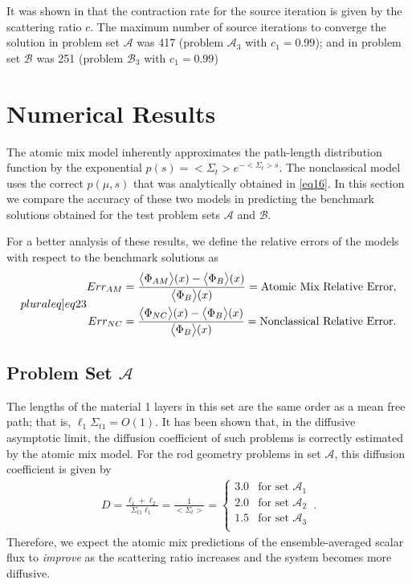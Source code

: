 \documentclass[12pt]{article}
\newcommand{\bl}{\big<}
\newcommand{\bg}{\big>}
\newcommand{\seta}{\mathcal{A}}
\newcommand{\setb}{\mathcal{B}}
\begin{document}
{It was shown in \cite{kry13} that the contraction rate for the source iteration is given by the scattering ratio $c$. The maximum number of source iterations to converge the solution in problem set $\seta$ was 417 (problem $\seta_3$ with $c_1=0.99$);  and in problem set $\setb$ was 251 (problem $\setb_3$ with $c_1=0.99$)


\section{Numerical Results}\label{sec5}

The atomic mix model inherently approximates the path-length distribution function by the exponential $p(s) = \bl\Sigma_t\bg e^{-\bl\Sigma_t\bg s}$.
The nonclassical model uses the correct $p(\mu,s)$ that was analytically obtained in \cref{eq16}.
In this section we compare the accuracy of these two models in predicting the benchmark solutions obtained for the test problem sets $\seta$ and $\setb$. 

For a better analysis of these results, we define the relative errors of the models with respect to the benchmark solutions as
\begin{subequations}\label[pluraleq]{eq23}
\begin{align}
 Err_{AM}&= \frac{\bl\Phi_{AM}\bg(x)-\bl\Phi_B\bg(x)}{\bl\Phi_B\bg(x)}=\text{Atomic Mix Relative Error},\\
 Err_{NC}&= \frac{\bl\Phi_{NC}\bg(x)-\bl\Phi_B\bg(x)}{\bl\Phi_B\bg(x)}=\text{Nonclassical Relative Error}.
\end{align}
\end{subequations}

\subsection{Problem Set $\seta$}

The lengths of the material 1 layers in this set are the same order as a mean free path; that is, $\ell_1\Sigma_{t1} = O(1)$.
It has been shown \cite{larvas05} that, in the diffusive asymptotic limit, the diffusion coefficient of such problems is correctly estimated by the atomic mix model.
For the rod geometry problems in set $\seta$, this diffusion coefficient is given by
\begin{align}\label{eq24}
D = \frac{\ell_1+\ell_2}{\Sigma_{t1}\ell_1} = \frac{1}{\bl\Sigma_t\bg} =
\left\{
\begin{array}{cl}
3.0 & \text{for set $\seta_1$}\\
2.0 & \text{for set $\seta_2$}\\
1.5 & \text{for set $\seta_3$}\\
\end{array}
\right . \, .
\end{align}  
Therefore, we expect the atomic mix predictions of the ensemble-averaged scalar flux to {\em improve} as the scattering ratio increases and the system becomes more diffusive.

}
\end{document}
